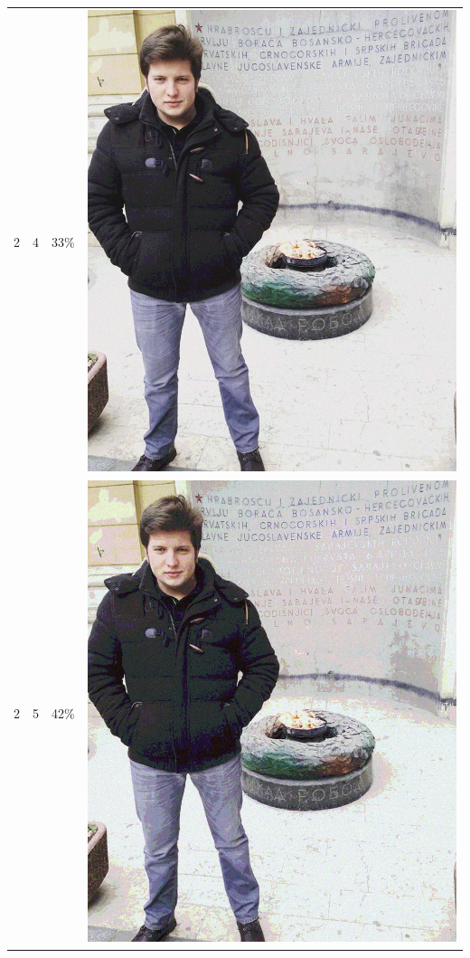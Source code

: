 \documentclass[times, utf8, seminar]{fer}
\begin{document}
\begin{center}
\begin{longtable}{|c|c|c|c|}
2 & 4 &33\% & \includegraphics[scale=0.3]{../benchmark_results/pattern/2_components-4_bits.png} \\
2 & 5 &42\% & \includegraphics[scale=0.3]{../benchmark_results/pattern/2_components-5_bits.png} \\

\end{longtable}
\end{center}
\end{document}

